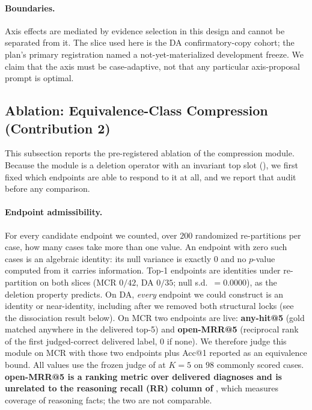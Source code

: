 \paragraph{Boundaries.}
Axis effects are mediated by evidence selection in this design and cannot be separated from it.
The slice used here is the DA confirmatory-copy cohort; the plan's primary registration named a not-yet-materialized development freeze.
We claim that the axis must be case-adaptive, not that any particular axis-proposal prompt is optimal.

\subsection{Ablation: Equivalence-Class Compression (Contribution 2)}
\label{sec:res-eq}

This subsection reports the pre-registered ablation of the compression module.
Because the module is a deletion operator with an invariant top slot (), we first fixed which endpoints are able to respond to it at all, and we report that audit before any comparison.

\paragraph{Endpoint admissibility.}
For every candidate endpoint we counted, over $200$ randomized re-partitions per case, how many cases take more than one value.
An endpoint with zero such cases is an algebraic identity: its null variance is exactly $0$ and no $p$-value computed from it carries information.
Top-1 endpoints are identities under re-partition on both slices (MCR $0/42$, DA $0/35$; null s.d.\ $=0.0000$), as the deletion property predicts.
On DA, \emph{every} endpoint we could construct is an identity or near-identity, including after we removed both structural locks (see the dissociation result below).
On MCR two endpoints are live: \textbf{any-hit@5} (gold matched anywhere in the delivered top-5) and \textbf{open-MRR@5} (reciprocal rank of the first judged-correct delivered label, $0$ if none).
We therefore judge this module on MCR with those two endpoints plus Acc@1 reported as an equivalence bound.
All values use the frozen judge of  at $K{=}5$ on $98$ commonly scored cases.
\textbf{open-MRR@5 is a ranking metric over delivered diagnoses and is unrelated to the reasoning recall (RR) column of }, which measures coverage of reasoning facts; the two are not comparable.

